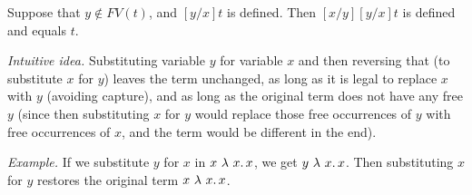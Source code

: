 \begin{lemma}
\label{lem:substundo}
  Suppose that $y\not\in\textit{FV}(t)$, and $[y/x]t$ is defined.  Then
  $[x/y][y/x]t$ is defined and equals $t$.
\end{lemma}

\noindent\textit{Intuitive idea.} Substituting variable $y$ for
variable $x$ and then reversing that (to substitute $x$ for $y$)
leaves the term unchanged, as long as it is legal to replace $x$ with
$y$ (avoiding capture), and as long as the original term does not have any free $y$ (since then substituting $x$ for $y$ would replace those free occurrences of $y$ with free occurrences of $x$, and the term would be different in the end).

\vspace{.2cm}

\noindent\textit{Example.} If we substitute $y$ for $x$ in $x\ \lam{x}{x}$, we get $y\ \lambda\ x.\, x$.  Then substituting $x$ for
$y$ restores the original term $x\ \lam{x}{x}$.

